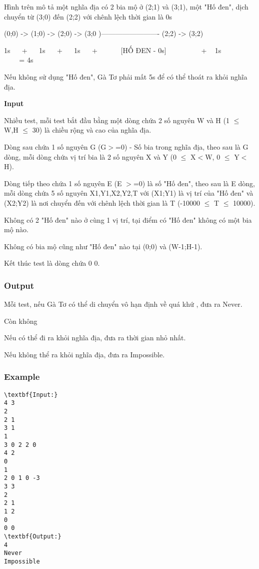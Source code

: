 Hình trên mô tả một nghĩa địa có 2 bia mộ ở (2;1) và (3;1), một "Hố đen", dịch chuyển từ (3;0) đến (2;2) với chênh lệch thời gian là 0s

(0;0) -> (1;0) -> (2;0) -> (3;0 )------------------------- (2;2) -> (3;2)

1s    +    1s    +    1s    +        [HỐ ĐEN - 0s]            +   1s                = 4s

Nếu không sử dụng "Hố đen", Gà Tơ phải mất 5s để có thể thoát ra khỏi nghĩa địa.

\textbf{Input }

Nhiều test, mỗi test bắt đầu bằng một dòng chứa 2 số nguyên W và H (1 $\le$  W,H  $\le$  30) là chiều rộng và cao của nghĩa địa.

Dòng sau chứa 1 số nguyên G (G$>$=0) - Số bia trong nghĩa địa, theo sau là G dòng, mỗi dòng chứa vị trí bia là 2 số nguyên X và Y (0 $\le$ X$<$W, 0 $\le$ Y$<$H).

Dòng tiếp theo chứa 1 số nguyên E (E $>$=0) là số "Hố đen", theo sau là E dòng, mỗi dòng chứa 5 số nguyên X1,Y1,X2,Y2,T với (X1;Y1) là vị trí của "Hố đen" và (X2;Y2) là nơi chuyển đến với chênh lệch thời gian là T (-10000  $\le$  T  $\le$  10000).

Không có 2 "Hố đen" nào ở cùng 1 vị trí, tại điểm có "Hố đen" không có một bia mộ nào.

Không có bia mộ cũng như "Hố đen" nào tại (0;0) và (W-1;H-1).

Kết thúc test là dòng chứa 0 0.

\subsubsection{Output}

Mỗi test, nếu Gà Tơ có thể di chuyển vô hạn định về quá khứ , đưa ra Never.

Còn không

Nếu có thể đi ra khỏi nghĩa địa, đưa ra thời gian nhỏ nhất.

Nếu không thể ra khỏi nghĩa địa, đưa ra Impossible.

\subsubsection{Example}
\begin{verbatim}
\textbf{Input:}
4 3
2
2 1
3 1
1
3 0 2 2 0
4 2
0
1
2 0 1 0 -3
3 3
2
2 1
1 2
0
0 0
\textbf{Output:}
4
Never
Impossible\end{verbatim}
